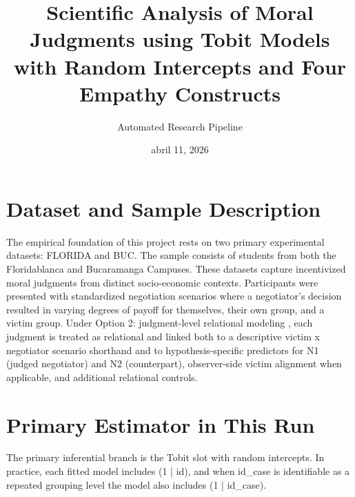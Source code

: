 \documentclass[11pt]{article}
\title{Scientific Analysis of Moral Judgments using Tobit Models with Random Intercepts and Four Empathy Constructs}
\author{Automated Research Pipeline}
\date{abril 11, 2026}
\begin{document}
\maketitle

\section{Dataset and Sample Description}
The empirical foundation of this project rests on two primary experimental datasets: FLORIDA and BUC.  The sample consists of students from both the Floridablanca and Bucaramanga Campuses.  These datasets capture incentivized moral judgments from distinct socio-economic contexts. Participants were presented  with standardized negotiation scenarios where a negotiator's decision resulted in varying degrees of payoff for  themselves, their own group, and a victim group. Under  Option 2: judgment-level relational modeling , each judgment is treated as relational and linked both to a descriptive victim x negotiator scenario shorthand and to hypothesis-specific predictors for N1 (judged negotiator) and N2 (counterpart), observer-side victim alignment when applicable, and additional relational controls.

\section{Primary Estimator in This Run}
The primary inferential branch is the Tobit slot with random intercepts. In practice, each fitted model includes (1 | id), and when id\_case is identifiable as a repeated grouping level the model also includes (1 | id\_case).
\end{document}
